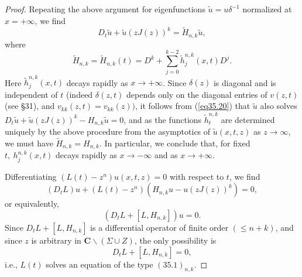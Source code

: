 \documentclass{surv-l}
\theoremstyle{plain}
\theoremstyle{definition}
\numberwithin{equation}{chapter}
\begin{document}
\begin{proof}
Repeating the above argument for eigenfunctions $\tilde{u}=u\delta^{-1}$ normalized at $ x=+\infty$, we find
\begin{equation}\label{eq35.22}
D_{t}\tilde{u}+\tilde{u}(zJ(z))^{k}=\tilde{H}_{n,k}\tilde{u},
\end{equation}
where
\begin{equation}\label{eq35.23}
\widetilde{H}_{n,k}=\widetilde{H}_{n,k}(t)=D^{k}+\sum_{j=0}^{k-2}\tilde{h}_{j}^{n,k}(x,t)D^{j}.
\end{equation}
Here $\tilde{h}_{j}^{n, k}(x, t)$ decays rapidly as $ x\rightarrow+\infty$. Since $\delta(z)$ is diagonal and is independent of $t$ (indeed $\delta(z, t)$ depends only on the diagonal entries of $v(z,t)$ (see \S 31), and $v_{kk}(z,t)=v_{kk}(z))$, it follows from (\ref{eq35.20}) that $\tilde{u}$ also solves $D_{t}\tilde{u}+\tilde{u}(zJ(z))^{k}-H_{n,k}\tilde{u}=0$, and as the functions $\tilde{h}_{t}^{n,k}$ are determined uniquely by the above procedure from the asymptotics of $\tilde{u}(x, t, z)$ as $ z\rightarrow\infty$, we must have $\widetilde{H}_{n,k}=H_{n,k}$. In particular, we conclude that, for fixed $t,\ h_{j}^{n,k}(x, t)$ decays rapidly as $ x\rightarrow-\infty$ and as $ x\rightarrow+\infty$.

Differentiating $(L(t)-z^{n})u(x, t,z)=0$ with respect to $t$, we find
\begin{equation*}
(D_{t}L)u+(L(t)-z^{n})(H_{n,k}u-u(zJ(z))^{k})=0,
\end{equation*}
or equivalently,
\begin{equation*}
(D_{t}L+[L,H_{n,k}])u=0.
\end{equation*}
Since $D_{t}L+[L, H_{n,k}]$ is a differential operator of finite order $(\leq n+k)$, and since $z$ is arbitrary in $\mathbf{C}\backslash (\Sigma\cup Z)$, the only possibility is
\begin{equation*}
D_{t}L+[L, H_{n,k}]=0,
\end{equation*}
i.e., $L(t)$ solves an equation of the type $(35.1)_{n,k}$.


\end{proof}
\end{document}
